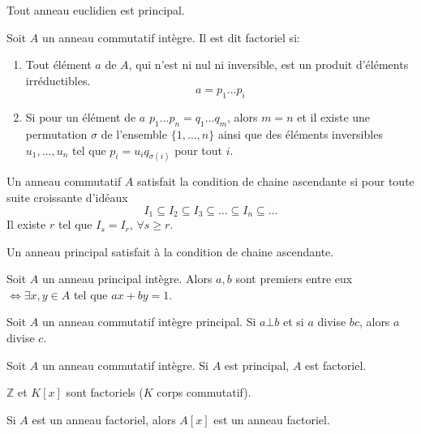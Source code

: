 \documentclass[12pt,a4paper]{article}
\begin{document}
\begin{flushleft}
\begin{thm}
Tout anneau euclidien est principal.
\end{thm}

\begin{mydef}
Soit $A$ un anneau commutatif intègre. Il est dit factoriel si: 
\begin{enumerate}
\item Tout élément $a$ de $A$, qui n'est ni nul ni inversible, est un produit d'éléments irréductibles.
$$ a = p_1 \ldots p_i$$
\item Si pour un élément de $a$ $p_1 \ldots p_n = q_1 \ldots q_m$, alors $m = n$ et il existe une 	permutation $\sigma$ de l'ensemble $\{ 1, \ldots , n \}$ ainsi que des éléments inversibles $u_1 , \ldots , u_n$ tel que $p_i = u_i q_{\sigma (i)}$ pour tout $i$.
\end{enumerate}
\end{mydef}

\begin{mydef}
Un anneau commutatif $A$ satisfait la condition de chaine ascendante si pour toute suite croissante d'idéaux
$$I_1 \subseteq I_2 \subseteq I_3 \subseteq \ldots \subseteq I_n \subseteq \ldots$$
Il existe $r$ tel que $I_s = I_r$, $\forall s \geq r$.
\end{mydef}

\begin{lem}
Un anneau principal satisfait à la condition de chaine ascendante.
\end{lem}

\begin{lem}
Soit $A$ un anneau principal intègre. Alors $a, b$ sont premiers entre eux $\Leftrightarrow \exists x, y \in A$ tel que $ax + by = 1$.
\end{lem}

\begin{lem}
Soit $A$ un anneau commutatif intègre principal. Si $a \bot b$ et si $a$ divise $bc$, alors $a$ divise $c$.
\end{lem}

\begin{thm}
Soit $A$ un anneau commutatif intègre. Si $A$ est principal, $A$ est factoriel.
\end{thm}

\begin{cor}
$\mathbb{Z}$ et $K [x]$ sont factoriels ($K$ corps commutatif).
\end{cor}

\begin{thm}
Si $A$ est un anneau factoriel, alors $A[x]$ est un anneau factoriel.
\end{thm}


\end{flushleft}
\end{document}
